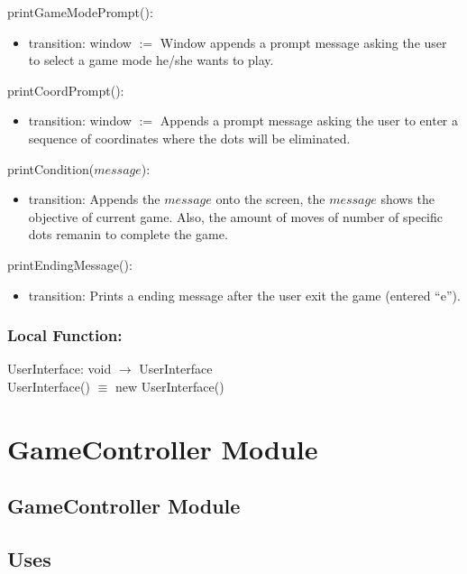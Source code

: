 \documentclass[12pt]{article}
\begin{document}
\noindent printGameModePrompt():
\begin{itemize}
\item transition: window $:=$ Window appends a prompt message asking the user to select a
                              game mode he/she wants to play.
\end{itemize}

\noindent printCoordPrompt():
\begin{itemize}
\item transition: window $:=$ Appends a prompt message asking the user to enter a sequence
                              of coordinates where the dots will be eliminated.
\end{itemize}

\noindent printCondition($message$):
\begin{itemize}
\item transition: Appends the $message$ onto the screen, the $message$ shows the objective of current game. Also, the amount of moves
                  of number of specific dots remanin to complete the game.
\end{itemize}

\noindent printEndingMessage():
\begin{itemize}
\item transition: Prints a ending message after the user exit the game (entered ``e'').
\end{itemize}

\subsubsection*{Local Function:}

UserInterface: void $\rightarrow$ UserInterface \\
UserInterface() $\equiv$ new UserInterface()

\newpage

\section* {GameController Module}

\subsection* {GameController Module}

\subsection* {Uses}
\end{document}
